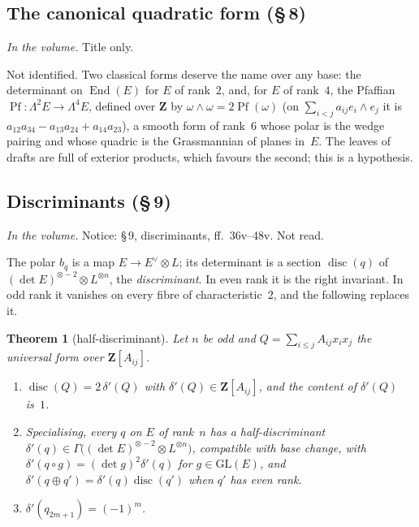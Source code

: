 \documentclass[11pt,a4paper]{amsart}
\newcommand{\End}{\operatorname{End}}
\newcommand{\GL}{\mathrm{GL}}
\newcommand{\Z}{\mathbf{Z}}
\newcommand{\disc}{\operatorname{disc}}
\newcommand{\status}[1]{\par\smallskip\noindent\textit{In the volume.} #1\par\smallskip}
\theoremstyle{plain}
\newtheorem{theorem}{Theorem}[section]
\theoremstyle{definition}
\begin{document}
\subsection{The canonical quadratic form (\S\,8)}
\status{Title only.}
Not identified. Two classical forms deserve the name over any base: the determinant on $\End(E)$ for $E$ of rank~$2$, and, for $E$ of rank~$4$, the Pfaffian $\operatorname{Pf}\colon\Lambda^2E\to\Lambda^4E$, defined over $\Z$ by $\omega\wedge\omega=2\operatorname{Pf}(\omega)$ (on $\sum_{i<j}a_{ij}e_i\wedge e_j$ it is $a_{12}a_{34}-a_{13}a_{24}+a_{14}a_{23}$), a smooth form of rank~$6$ whose polar is the wedge pairing and whose quadric is the Grassmannian of planes in~$E$. The leaves of drafts are full of exterior products, which favours the second; this is a hypothesis.

\subsection{Discriminants (\S\,9)}\label{sub:disc}
\status{Notice: \S\,9, discriminants, ff.~36v--48v. Not read.}
The polar $b_q$ is a map $E\to E^\vee\otimes L$; its determinant is a section $\disc(q)$ of $(\det E)^{\otimes-2}\otimes L^{\otimes n}$, the \emph{discriminant}. In even rank it is the right invariant. In odd rank it vanishes on every fibre of characteristic~$2$, and the following replaces it.

\begin{theorem}[half-discriminant]\label{thm:halfdisc}
Let $n$ be odd and $Q=\sum_{i\le j}A_{ij}x_ix_j$ the universal form over $\Z[A_{ij}]$.
\begin{enumerate}
\item $\disc(Q)=2\,\delta'(Q)$ with $\delta'(Q)\in\Z[A_{ij}]$, and the content of $\delta'(Q)$ is~$1$.
\item Specialising, every $q$ on $E$ of rank~$n$ has a half-discriminant $\delta'(q)\in\Gamma\bigl((\det E)^{\otimes-2}\otimes L^{\otimes n}\bigr)$, compatible with base change, with $\delta'(q\circ g)=(\det g)^2\delta'(q)$ for $g\in\GL(E)$, and $\delta'(q\oplus q')=\delta'(q)\disc(q')$ when $q'$ has even rank.
\item $\delta'(q_{2m+1})=(-1)^m$.
\end{enumerate}
\end{theorem}
\end{document}
